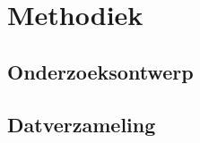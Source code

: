 \chapter{Methodiek}
\label{hoofdstuk:methodiek}
\section{Onderzoeksontwerp}

\section{Datverzameling}